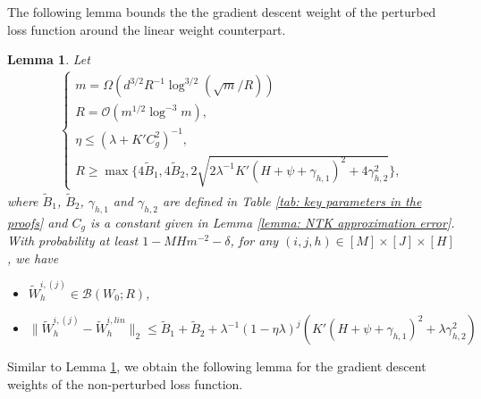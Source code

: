 \documentclass{article} \usepackage{iclr2023/iclr2023_conference,times}
\newtheorem{lemma}{Lemma}[section]
\begin{document}
The following lemma bounds the the gradient descent weight of the perturbed loss function around the linear weight counterpart. 



\begin{lemma}
Let 
\begin{align}
\begin{cases}
m = \Omega \left( d^{3/2}  R^{-1} \log^{3/2} (\sqrt{m} / R) \right) \\
      R = \mathcal{O} \left( m^{1/2} \log^{-3} m \right), \\ 
\eta \leq (\lambda + K' C_g^2)^{-1}, \\
R \geq \max\{ 4 \tilde{B}_1, 4 \tilde{B}_2, 2 \sqrt{2\lambda^{-1}K' (H + \psi + \gamma_{h,1})^2 + 4 \gamma_{h,2}^2} \},
\end{cases}
\label{equation: improved conditions for R and eta comprehensive list}
\end{align}
where $\tilde{B}_1$, $\tilde{B}_2$, $\gamma_{h,1}$ and $\gamma_{h,2}$ are defined in Table \ref{tab: key parameters in the proofs} and $C_g$ is a constant given in Lemma \ref{lemma: NTK approximation error}. 
With probability at least $1 -  MH m^{-2} - \delta$, for any $(i,j,h) \in [M] \times [J] \times [H]$, we have 
\begin{itemize}
    \item $\tilde{W}_h^{i, (j)} \in \mathcal{B}(W_0; R)$, 
    \item $\| \tilde{W}_h^{i, (j)} - \tilde{W}_h^{i,lin} \|_2 \leq \tilde{B}_1 + \tilde{B}_2 + \lambda^{-1}(1 - \eta \lambda)^j \left( K'(H + \psi + \gamma_{h,1} )^2 + \lambda \gamma_{h,2}^2\right)$
\end{itemize}
\label{lemma: improve bounding GD weight and that of linear auxilary}
\end{lemma}

Similar to Lemma \ref{lemma: improve bounding GD weight and that of linear auxilary}, we obtain the following lemma for the gradient descent weights of the non-perturbed loss function. 
\end{document}
